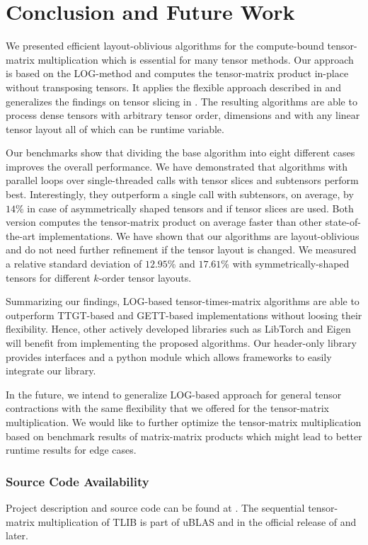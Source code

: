 \section{Conclusion and Future Work}
\label{sec:conclusion}
We presented efficient layout-oblivious algorithms for the compute-bound tensor-matrix multiplication which is essential for many tensor methods.
Our approach is based on the LOG-method and computes the tensor-matrix product in-place without transposing tensors.
It applies the flexible approach described in \cite{bassoy:2019:ttv} and generalizes the findings on tensor slicing in \cite{li:2015:input}.
The resulting algorithms are able to process dense tensors with arbitrary tensor order, dimensions and with any linear tensor layout all of which can be runtime variable.

Our benchmarks show that dividing the base algorithm into eight different  cases improves the overall performance.
We have demonstrated that algorithms with parallel loops over single-threaded  calls with tensor slices and subtensors perform best.
Interestingly, they outperform a single  call with subtensors, on average, by $14$\% in case of asymmetrically shaped tensors and if tensor slices are used.
Both version computes the tensor-matrix product on average faster than other state-of-the-art implementations.
We have shown that our algorithms are layout-oblivious and do not need further refinement if the tensor layout is changed. 
We measured a relative standard deviation of $12.95$\% and $17.61$\% with symmetrically-shaped tensors for different $k$-order tensor layouts.

Summarizing our findings, LOG-based tensor-times-matrix algorithms are able to outperform TTGT-based and GETT-based implementations without loosing their flexibility.
Hence, other actively developed libraries such as LibTorch and Eigen will benefit from implementing the proposed algorithms.
Our header-only library provides  interfaces and a python module which allows frameworks to easily integrate our library.

In the future, we intend to generalize LOG-based approach for general tensor contractions with the same flexibility that we offered for the tensor-matrix multiplication. 
We would like to further optimize the tensor-matrix multiplication based on benchmark results of matrix-matrix products which might lead to better runtime results for edge cases.

\subsubsection{Source Code Availability}
Project description and source code can be found at {\footnotesize {}}.
The sequential tensor-matrix multiplication of TLIB is part of uBLAS and in the official release of   and later.
